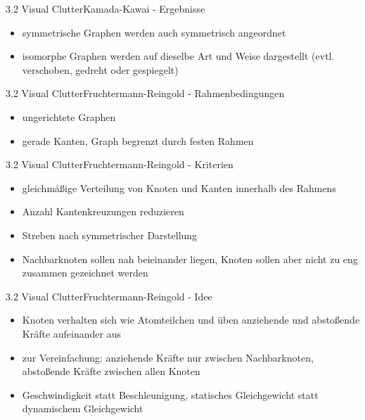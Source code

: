 \documentclass[%
11pt,a4paper,xcolor={usenames,dvipsnames}]{beamer}
\begin{document}
    \begin{frame}{3.2 Visual Clutter}{Kamada-Kawai - Ergebnisse}
        \begin{itemize}
        	\item symmetrische Graphen werden auch symmetrisch angeordnet
        	\item isomorphe Graphen werden auf dieselbe Art und Weise dargestellt (evtl. verschoben, gedreht oder gespiegelt)
    	\end{itemize}
    \end{frame}


    \begin{frame}{3.2 Visual Clutter}{Fruchtermann-Reingold - Rahmenbedingungen}
        \begin{itemize}
        	\item ungerichtete Graphen
        	\item gerade Kanten, Graph begrenzt durch festen Rahmen
    	\end{itemize}
    \end{frame}

    \begin{frame}{3.2 Visual Clutter}{Fruchtermann-Reingold - Kriterien}
        \begin{itemize}
        	\item gleichmäßige Verteilung von Knoten und Kanten innerhalb des Rahmens
        	\item Anzahl Kantenkreuzungen reduzieren
        	\item Streben nach symmetrischer Darstellung
        	\item Nachbarknoten sollen nah beieinander liegen, Knoten sollen aber nicht zu eng zusammen gezeichnet werden
    	\end{itemize}
    \end{frame}

    \begin{frame}{3.2 Visual Clutter}{Fruchtermann-Reingold - Idee}
        \begin{itemize}
        	\item Knoten verhalten sich wie Atomteilchen und üben anziehende und abstoßende Kräfte aufeinander aus
        	\item zur Vereinfachung: anziehende Kräfte nur zwischen Nachbarknoten, abstoßende Kräfte zwischen allen Knoten
        	\item Geschwindigkeit statt Beschleunigung, statisches Gleichgewicht statt dynamischem Gleichgewicht
    	\end{itemize}
    \end{frame}
\end{document}
